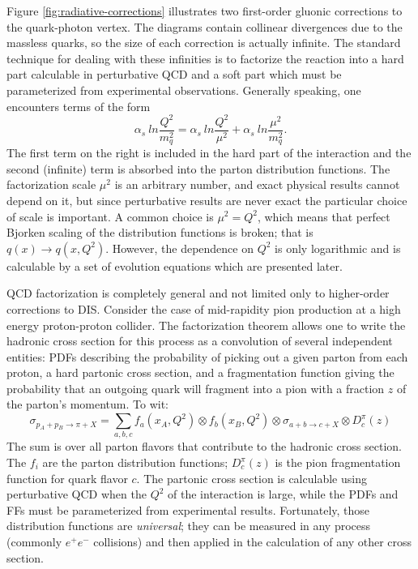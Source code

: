 Figure \ref{fig:radiative-corrections} illustrates two first-order gluonic
corrections to the quark-photon vertex. The diagrams contain collinear
divergences due to the massless quarks, so the size of each correction is
actually infinite. The standard technique for dealing with these infinities is
to factorize the reaction into a hard part calculable in perturbative QCD and a
soft part which must be parameterized from experimental observations. Generally
speaking, one encounters terms of the form
%
\begin{equation}
  \alpha_s~ln \frac{Q^2}{m_q^2} = \alpha_s~ln \frac{Q^2}{\mu^2} + \alpha_s~ln \frac{\mu^2}{m_q^2}.
\end{equation}
%
The first term on the right is included in the hard part of the interaction and
the second (infinite) term is absorbed into the parton distribution functions.
The factorization scale \(\mu^2\) is an arbitrary number, and exact physical
results cannot depend on it, but since perturbative results are never exact the
particular choice of scale is important. A common choice is
\(\mu^2 = Q^2\), which means that perfect Bjorken scaling of the distribution
functions is broken; that is \(q(x) \rightarrow q(x,Q^2)\). However, the
dependence on \(Q^2\) is only logarithmic and is calculable by a set of
evolution equations which are presented later.

QCD factorization is completely general and not limited only to higher-order
corrections to DIS. Consider the case of mid-rapidity pion production at a high
energy proton-proton collider. The factorization theorem allows one to write the
hadronic cross section for this process as a convolution of several independent
entities: PDFs describing the probability of picking out a given parton from
each proton, a hard partonic cross section, and a fragmentation function giving
the probability that an outgoing quark will fragment into a pion with a fraction
\(z\) of the parton's momentum. To wit:
%
\begin{equation}
  \sigma_{p_A+p_B \rightarrow \pi+X} = \sum_{a,b,c} f_a(x_A, Q^2) \otimes f_b(x_B, Q^2) \otimes \sigma_{a+b \rightarrow c + X} \otimes D_c^{\pi}(z)
  \label{eqn:factorization}
\end{equation}
%
The sum is over all parton flavors that contribute to the hadronic cross
section. The \(f_i\) are the parton distribution functions; \(D_c^{\pi}(z)\) is
the pion fragmentation function for quark flavor \(c\). The partonic cross
section is calculable using perturbative QCD when the \(Q^2\) of the interaction
is large, while the PDFs and FFs must be parameterized from experimental
results. Fortunately, those distribution functions are \textit{universal}; they
can be measured in any process (commonly \(e^+e^-\) collisions) and then applied
in the calculation of any other cross section. 

